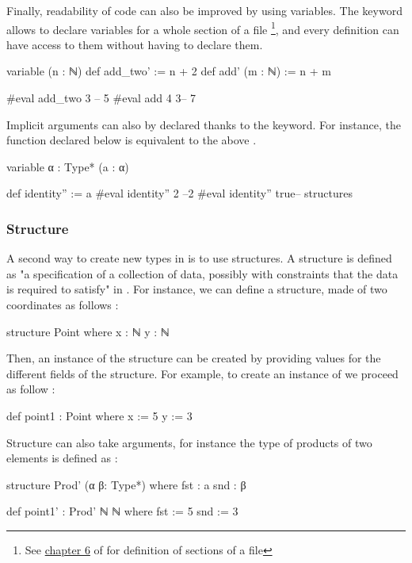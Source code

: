 Finally, readability of \Lean code can also be improved by using variables. The  keyword allows to declare variables for a whole section of a file \footnote{See \href{https://leanprover.github.io/theorem_proving_in_lean4/interacting_with_lean.html}{chapter 6} of \cite{noauthor_theorem_nodate} for definition of sections of a \Lean file}, and every definition can have access to them without having to declare them.
\begin{leancode}
variable (n : ℕ)
def add_two' := n + 2
def add' (m : ℕ) := n + m

#eval add_two 3 -- 5
#eval add 4 3-- 7
\end{leancode}

Implicit arguments can also by declared thanks to the  keyword. For instance, the  function declared below is  equivalent to the above .

\begin{leancode}
variable {α : Type*} (a : α)

def identity'' := a
#eval identity'' 2 --2
#eval identity'' true-- structures
\end{leancode}

\subsubsection{Structure}

A second way to create new types in \Lean is to use structures. A structure is defined as "a specification of a collection of data, possibly with constraints that the data is required to satisfy" in \cite{noauthor_mathematics_nodate}. For instance, we can define a  structure, made of two coordinates as follows :
\begin{leancode}
structure Point where
  x : ℕ
  y : ℕ
\end{leancode}

Then, an instance of the structure can be created by providing values for the different fields of the structure. For example, to create an instance  of  we proceed as follow :
\begin{leancode}
def point1 : Point where
  x := 5
  y := 3
\end{leancode}

Structure can also take arguments, for instance the type  of products of two elements is defined as :
\begin{leancode}
structure Prod' (α β: Type*) where
  fst : a
  snd : β

def point1' : Prod' ℕ ℕ where
  fst := 5
  snd := 3
\end{leancode}


